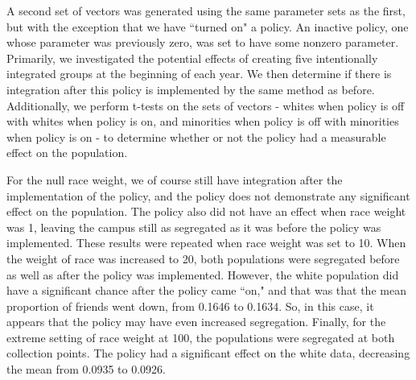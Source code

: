 A second set of vectors was generated using the same parameter sets as the first, but with the exception that we have ``turned 
on" a policy. An inactive policy, one whose parameter was previously zero, was set to have some nonzero parameter. Primarily, 
we investigated the potential effects of creating five intentionally integrated groups at the beginning of each year. We then 
determine if there is integration after this policy is implemented by the same method as before. Additionally, we perform 
t-tests on the sets of vectors - whites when policy is off with whites when policy is on, and minorities when policy is off 
with minorities when policy is on - to determine whether or not the policy had a measurable effect on the population. 

For the null race weight, we of course still have integration after the implementation of the policy, and the policy does not 
demonstrate any significant effect on the population. The policy also did not have an effect when race weight was 1, leaving 
the campus still as segregated as it was before the policy was implemented. These results were repeated when race weight was 
set to 10. When the weight of race was increased to 20, both populations were segregated before as well as after the policy 
was implemented. However, the white population did have a significant chance after the policy came ``on," and that was that 
the mean proportion of friends went down, from 0.1646 to 0.1634. So, in this case, it appears that the policy may have even 
increased segregation. Finally, for the extreme setting of race weight at 100, the populations were segregated at both 
collection points. The policy had a significant effect on the white data, decreasing the mean from 0.0935 to 0.0926.

